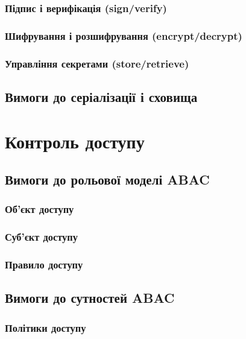 \subsubsection{Підпис і верифікація (sign/verify)}

\subsubsection{Шифрування і розшифрування (encrypt/decrypt)}

\subsubsection{Управління секретами (store/retrieve)}

\subsection{Вимоги до серіалізації і сховища}

\newpage
\section{Контроль доступу}

\subsection{Вимоги до рольової моделі ABAC}

\subsubsection{Об'єкт доступу}

\subsubsection{Суб'єкт доступу}

\subsubsection{Правило доступу}

\subsection{Вимоги до сутностей ABAC}

\subsubsection{Політики доступу}

